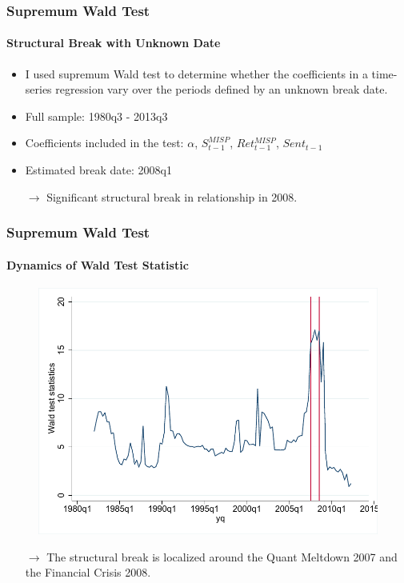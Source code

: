 \documentclass{beamer}
\begin{document}
\begin{frame}
\frametitle{Supremum Wald Test}
\framesubtitle{Structural Break with Unknown Date}
\vspace*{-0.3cm}
\begin{itemize}
\vspace*{-0.4cm}
\item  I used supremum Wald test to determine whether the coefficients in a time-series regression vary over the periods defined by an unknown break date.
\item Full sample: 1980q3 - 2013q3
\item Coefficients included in the test: $\alpha$, $S^{MISP}_{t-1}$, $Ret^{MISP}_{t-1}$, $Sent_{t-1}$
\item Estimated break date: 2008q1
\end{itemize}
\begin{table}[htbp]
  \flushleft
  \centering
  	  \resizebox{0.35\textwidth}{!}{	 	
	 	
	\label{tab:swald}%
	}
\end{table}
\begin{itemize}

\item[$\rightarrow$]Significant structural break in relationship in 2008.
\end{itemize}
\end{frame}
\begin{frame}
\frametitle{Supremum Wald Test}
\framesubtitle{Dynamics of Wald Test Statistic}

\begin{figure}[htbp]
\centering
	\includegraphics[scale=0.7,trim=1 1 1 1,clip]{figures/spread_structural_wald.pdf} 
	\label{tab:spread_structural_wald}%
\end{figure}
\begin{itemize}
\vspace*{-0.4cm}
\item[$\rightarrow$] The structural break is localized around the Quant Meltdown 2007 and the Financial Crisis 2008.
\end{itemize}
\end{frame}
\end{document}
